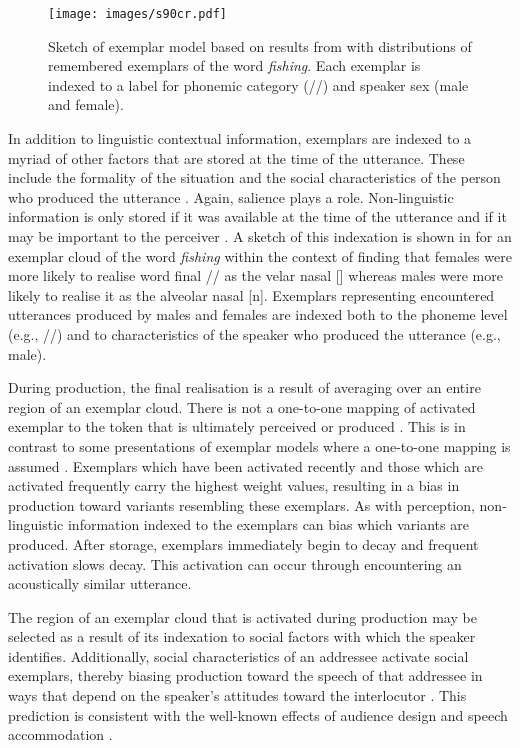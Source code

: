 \begin{figure}
  \texttt{[image: images/s90cr.pdf]} %
	\caption{Sketch of exemplar model based on results from \citet{trudgill1972} with distributions of remembered exemplars of the word \textit{fishing}.  Each exemplar is indexed to a label for phonemic category ({/{\ng}/}) and speaker sex (male and female).} 	\label{fig:with-phoneme-social-labels}
	
\end{figure} 

In addition to linguistic contextual information, exemplars are indexed to a myriad of other factors that are stored at the time of the utterance.  These include the formality of the situation and the social characteristics of the person who produced the utterance \citep{johnson1997,foulkesanddocherty2006}.  Again, salience plays a role. Non-linguistic information is only stored if it was available at the time of the utterance and if it may be important to the perceiver \citep[147]{johnson1997}.  A sketch of this indexation is shown in  for an exemplar cloud of the word \textit{fishing} within the context of  finding that females were more likely to realise word final {/{\ng}/} as the velar nasal {[{\ng}]} whereas males were more likely to realise it as the alveolar nasal {[n]}.  Exemplars representing encountered utterances produced by males and females are indexed both to the phoneme level (e.g., {/{\ng}/}) and to characteristics of the speaker who produced the utterance (e.g., male).  


During production, the final realisation is a result of averaging over an entire region of an exemplar cloud. There is not a one-to-one mapping of activated exemplar to the token that is ultimately perceived or produced \citep{pierrehumbert2001}.  This is in contrast to some presentations of exemplar models where a one-to-one mapping is assumed \citep{griffithsetal2007}.  Exemplars which have been activated recently and those which are activated frequently carry the highest weight values, resulting in a bias in production toward variants resembling these exemplars.  As with perception, non-linguistic information indexed to the exemplars can bias which variants are produced.  After storage, exemplars immediately begin to decay and frequent activation slows decay.  This activation can occur through encountering an acoustically similar utterance. 

The region of an exemplar cloud that is activated during production may be selected as a result of its indexation to social factors with which the speaker identifies.  Additionally, social characteristics of an addressee activate social exemplars, thereby biasing production toward the speech of that addressee in ways that depend on the speaker's attitudes toward the interlocutor \citep{drageretal2010,babel2012}.  This prediction is consistent with the well-known effects of audience design and speech accommodation \citep{bell1984,gilesetal1991,oprah1999}.

